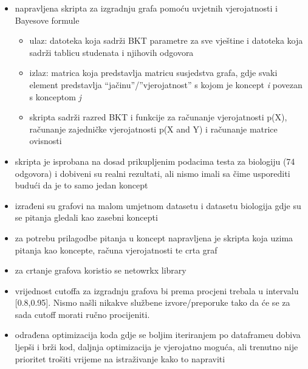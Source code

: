 		\begin{itemize}
			\item napravljena skripta za izgradnju grafa pomoću uvjetnih vjerojatnosti i Bayesove formule
			\begin{itemize}
				\item ulaz: datoteka koja sadrži BKT parametre za sve vještine i datoteka koja sadrži tablicu studenata i njihovih odgovora
				\item izlaz: matrica koja predstavlja matricu susjedstva grafa, gdje svaki element predstavlja “jačinu”/”vjerojatnost” s kojom je koncept \textit{i} povezan s konceptom \textit{j}
				\item skripta sadrži razred BKT i funkcije za računanje vjerojatnosti p(X), računanje zajedničke vjerojatnosti p(X and Y) i računanje matrice ovisnosti
			\end{itemize}
			\item skripta je isprobana na dosad prikupljenim podacima testa za biologiju (74 odgovora) i dobiveni su realni rezultati, ali nismo imali sa čime usporediti budući da je to samo jedan koncept
			\item izrađeni su grafovi na malom umjetnom datasetu i datasetu biologija gdje su se pitanja gledali kao zasebni koncepti
			\item za potrebu prilagodbe pitanja u koncept napravljena je skripta koja uzima pitanja kao koncepte, računa vjerojatnosti te crta graf
			\item za crtanje grafova koristio se netowrkx library
			\item vrijednost cutoffa za izgradnju grafova bi prema procjeni trebala u intervalu [0.8,0.95]. Nismo našli nikakve službene izvore/preporuke tako da  će se za sada cutoff morati ručno procijeniti.
			\item odrađena optimizacija koda gdje se boljim iteriranjem po dataframeu dobiva ljepši i brži kod, daljnja optimizacija je vjerojatno moguća, ali trenutno nije prioritet trošiti vrijeme na istraživanje kako to napraviti
		\end{itemize}
